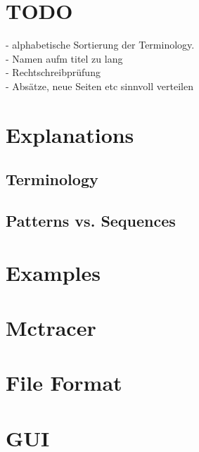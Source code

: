 \documentclass{scrartcl}
\begin{document}
\maketitle
\tableofcontents
\newpage

\section{TODO}
- alphabetische Sortierung der Terminology. \\
- Namen aufm titel zu lang \\
- Rechtschreibprüfung \\
- Absätze, neue Seiten etc sinnvoll verteilen \\

\section{Explanations}
	\subsection{Terminology} 
	\subsection{Patterns vs. Sequences} 
\section{Examples} 
\section{Mctracer} 
\section{File Format} 
\section{GUI} 
\end{document}

